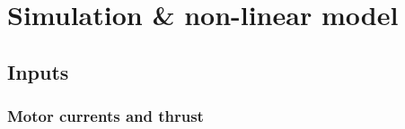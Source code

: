 \section{Simulation & non-linear model}
\subsection{Inputs}
\subsubsection{Motor currents and thrust}
